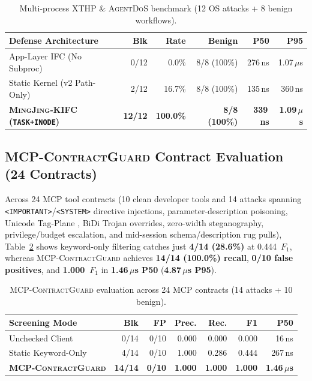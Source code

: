 \documentclass[10pt,twocolumn,letterpaper]{article}
\newcommand{\sys}{\textsc{MingJing-KIFC}}
\newcommand{\guard}{\textsc{MCP-ContractGuard}}
\newcommand{\code}[1]{\texttt{\small #1}}
\begin{document}
\begin{table}[t]
\centering
\scriptsize
\setlength{\tabcolsep}{1.5pt}
\caption{Multi-process XTHP \& \textsc{AgentDoS} benchmark (12 OS attacks + 8 benign workflows).}
\label{tab:xthp}
\begin{tabular}{@{}lrrrrr@{}}
\toprule
\textbf{Defense Architecture} & \textbf{Blk} & \textbf{Rate} & \textbf{Benign} & \textbf{P50} & \textbf{P95} \\
\midrule
App-Layer IFC (No Subproc)      & 0/12 & 0.0\% & 8/8 (100\%) & 276\,ns & 1.07\,$\mu$s \\
Static Kernel (v2 Path-Only)    & 2/12 & 16.7\% & 8/8 (100\%) & 135\,ns & 360\,ns \\
\textbf{\sys{} (\code{TASK+INODE})} & \textbf{12/12} & \textbf{100.0\%} & \textbf{8/8 (100\%)} & \textbf{339\,ns} & \textbf{1.09\,$\mu$s} \\
\bottomrule
\end{tabular}
\end{table}

\subsection{\guard{} Contract Evaluation (24 Contracts)}
Across 24 MCP tool contracts (10 clean developer tools and 14 attacks spanning \code{<IMPORTANT>}/\code{<SYSTEM>} directive injections, parameter-description poisoning, Unicode Tag-Plane , BiDi Trojan overrides, zero-width steganography, privilege/budget escalation, and mid-session schema/description rug pulls), Table~\ref{tab:mcp_guard} shows keyword-only filtering catches just \textbf{4/14 (28.6\%)} at 0.444~$F_1$, whereas \guard{} achieves \textbf{14/14 (100.0\%) recall}, \textbf{0/10 false positives}, and \textbf{1.000~$F_1$} in \textbf{1.46\,$\mu$s P50} (\textbf{4.87\,$\mu$s P95}).

\begin{table}[t]
\centering
\scriptsize
\setlength{\tabcolsep}{2.0pt}
\caption{\guard{} evaluation across 24 MCP contracts (14 attacks + 10 benign).}
\label{tab:mcp_guard}
\begin{tabular}{@{}lrrrrrr@{}}
\toprule
\textbf{Screening Mode} & \textbf{Blk} & \textbf{FP} & \textbf{Prec.} & \textbf{Rec.} & \textbf{F1} & \textbf{P50} \\
\midrule
Unchecked Client      & 0/14  & 0/10 & 0.000 & 0.000 & 0.000 & 16\,ns \\
Static Keyword-Only   & 4/14  & 0/10 & 1.000 & 0.286 & 0.444 & 267\,ns \\
\textbf{\guard{}}     & \textbf{14/14} & \textbf{0/10} & \textbf{1.000} & \textbf{1.000} & \textbf{1.000} & \textbf{1.46\,$\mu$s} \\
\bottomrule
\end{tabular}
\end{table}
\end{document}
